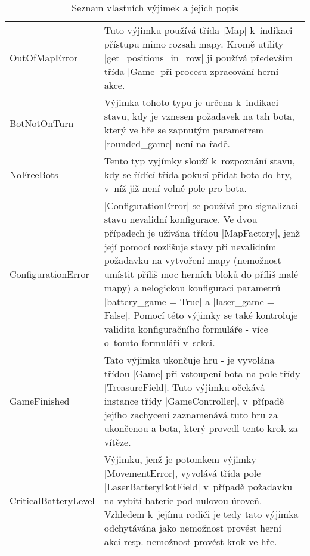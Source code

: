 {
	\renewcommand{\arraystretch}{1.2}
	\centering
	
	\begin{longtable}{ B || p{.6\textwidth} }
        \caption{Seznam vlastních výjimek a jejich popis}\label{table:custom-exceptions}\\

		OutOfMapError & Tuto výjimku používá třída \ic|Map| k~indikaci přístupu mimo rozsah mapy. Kromě utility \ic|get_positions_in_row| ji používá především třída \ic|Game| při procesu zpracování herní akce. \\

		BotNotOnTurn & Výjimka tohoto typu je určena k~indikaci stavu, kdy je vznesen požadavek na tah bota, který ve hře se zapnutým parametrem \ic|rounded_game| není na řadě. \\

		NoFreeBots & Tento typ vyjímky slouží k~rozpoznání stavu, kdy se řídící třída pokusí přidat bota do hry, v~níž již není volné pole pro bota. \\

		ConfigurationError & \ic|ConfigurationError| se používá pro signalizaci stavu nevalidní konfigurace. Ve dvou případech je užívána třídou \ic|MapFactory|, jenž její pomocí rozlišuje stavy při nevalidním požadavku na vytvoření mapy (nemožnost umístit příliš moc herních bloků do příliš malé mapy) a nelogickou konfiguraci parametrů \ic|battery_game = True| a \ic|laser_game = False|. Pomocí této výjimky se také kontroluje validita konfiguračního formuláře - více o~tomto formuláři v~sekci. \\

		GameFinished & Tato výjimka ukončuje hru - je vyvolána třídou \ic|Game| při vstoupení bota na pole třídy \ic|TreasureField|. Tuto výjimku očekává instance třídy \ic|GameController|, v~případě jejího zachycení zaznamenává tuto hru za ukončenou a bota, který provedl tento krok za vítěze. \\

		CriticalBatteryLevel & Výjimku, jenž je potomkem výjimky \ic|MovementError|, vyvolává třída pole \ic|LaserBatteryBotField| v~případě požadavku na vybití baterie pod nulovou úroveň. Vzhledem k~jejímu rodiči je tedy tato výjimka odchytávána jako nemožnost provést herní akci resp. nemožnost provést krok ve hře. \\
	\end{longtable}
}

